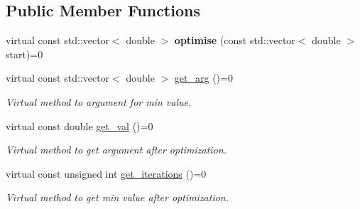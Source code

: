 \subsection*{Public Member Functions}
\begin{DoxyCompactItemize}
\item 
\mbox{\label{class_o_p_t_i_m_i_s_a_t_i_o_n_a3f2fcfe6f4cf0f58ddbf371f5c8ff7b5}} 
virtual const std\+::vector$<$ double $>$ {\bfseries optimise} (const std\+::vector$<$ double $>$ start)=0
\item 
\mbox{\label{class_o_p_t_i_m_i_s_a_t_i_o_n_aacf344bc5597a9e43ac1ab3d7524c99d}} 
virtual const std\+::vector$<$ double $>$ \hyperlink{class_o_p_t_i_m_i_s_a_t_i_o_n_aacf344bc5597a9e43ac1ab3d7524c99d}{get\+\_\+arg} ()=0
\begin{DoxyCompactList}\small\item\em Virtual method to argument for min value. \end{DoxyCompactList}\item 
\mbox{\label{class_o_p_t_i_m_i_s_a_t_i_o_n_a82e3d63c255420296cff9d5ac7e0c439}} 
virtual const double \hyperlink{class_o_p_t_i_m_i_s_a_t_i_o_n_a82e3d63c255420296cff9d5ac7e0c439}{get\+\_\+val} ()=0
\begin{DoxyCompactList}\small\item\em Virtual method to get argument after optimization. \end{DoxyCompactList}\item 
\mbox{\label{class_o_p_t_i_m_i_s_a_t_i_o_n_ac45869edc3951dbe68fb0b3293b53c28}} 
virtual const unsigned int \hyperlink{class_o_p_t_i_m_i_s_a_t_i_o_n_ac45869edc3951dbe68fb0b3293b53c28}{get\+\_\+iterations} ()=0
\begin{DoxyCompactList}\small\item\em Virtual method to get min value after optimization. \end{DoxyCompactList}\end{DoxyCompactItemize}
